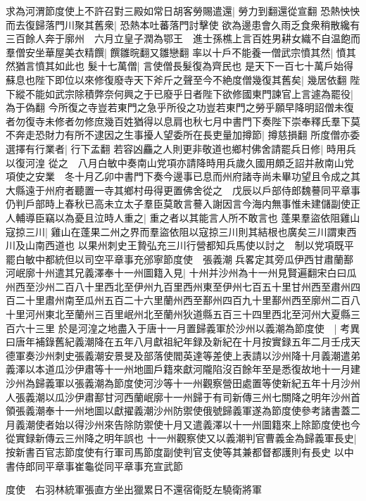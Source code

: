 求為河渭節度使上不許召對三殿如常日胡客勞賜遣還|{
	勞力到翻還從宣翻}
恐熱怏怏而去復歸落門川聚其舊衆|{
	恐熱本吐蕃落門討擊使}
欲為邊患會久雨乏食衆稍散纔有三百餘人奔于廓州　六月立皇子潤為鄂王　進士孫樵上言百姓男耕女織不自温飽而羣僧安坐華屋美衣精饌|{
	饌雛晥翻又雛戀翻}
率以十戶不能養一僧武宗憤其然|{
	憤其然猶言憤其如此也}
髮十七萬僧|{
	言使僧長髮復為齊民也}
是天下一百七十萬戶始得蘇息也陛下即位以來修復廢寺天下斧斤之聲至今不絶度僧幾復其舊矣|{
	幾居依翻}
陛下縱不能如武宗除積弊奈何興之于已廢乎日者陛下欲修國東門諫官上言遽為罷役|{
	為于偽翻}
今所復之寺豈若東門之急乎所役之功豈若東門之勞乎願早降明詔僧未復者勿復寺未修者勿修庶幾百姓猶得以息肩也秋七月中書門下奏陛下崇奉釋氏羣下莫不奔走恐財力有所不逮因之生事擾人望委所在長吏量加撙節|{
	撙慈損翻}
所度僧亦委選擇有行業者|{
	行下孟翻}
若容凶麤之人則更非敬道也鄉村佛舍請罷兵日修|{
	時用兵以復河湟}
從之　八月白敏中奏南山党項亦請降時用兵歲久國用頗乏詔并赦南山党項使之安業　冬十月乙卯中書門下奏今邊事已息而州府諸寺尚未畢功望且令成之其大縣遠于州府者聽置一寺其鄉村毋得更置佛舍從之　戊辰以戶部侍郎魏謩同平章事仍判戶部時上春秋已高未立太子羣臣莫敢言謩入謝因言今海内無事惟未建儲副使正人輔導臣竊以為憂且泣時人重之|{
	重之者以其能言人所不敢言也}
蓬果羣盜依阻雞山寇掠三川|{
	雞山在蓬果二州之界而羣盜依阻以寇掠三川則其結根也廣矣三川謂東西川及山南西道也}
以果州刺史王贄弘充三川行營都知兵馬使以討之　制以党項既平罷白敏中都統但以司空平章事充邠寧節度使　張義潮兵畧定其旁瓜伊西甘肅蘭鄯河岷廓十州遣其兄義澤奉十一州圖籍入見|{
	十州并沙州為十一州見賢遍翻宋白曰瓜州西至沙州二百八十里西北至伊州九百里西州東至伊州七百五十里甘州西至肅州四百二十里肅州南至瓜州五百二十六里蘭州西至鄯州四百九十里鄯州西至廓州二百八十里河州東北至蘭州三百里岷州北至蘭州狄道縣五百三十四里西北至河州大夏縣三百六十三里}
於是河湟之地盡入于唐十一月置歸義軍於沙州以義潮為節度使　|{
	考異曰唐年補錄舊紀義潮降在五年八月獻祖紀年録及新紀在十月按實録五年二月壬戌天德軍奏沙州刺史張義潮安景旻及部落使閻英達等差使上表請以沙州降十月義潮遣弟義澤以本道瓜沙伊肅等十一州地圖戶籍來獻河隴陷沒百餘年至是悉復故地十一月建沙州為歸義軍以張義潮為節度使河沙等十一州觀察營田處置等使新紀五年十月沙州人張義潮以瓜沙伊肅鄯甘河西蘭岷廓十一州歸于有司新傳三州七關降之明年沙州首領張義潮奉十一州地圖以獻擢義潮沙州防禦使俄號歸義軍遂為節度使參考諸書蓋二月義潮使者始以得沙州來告除防禦使十月又遣義澤以十一州圖籍來上除節度使也今從實録新傳云三州降之明年誤也}
十一州觀察使又以義潮判官曹義金為歸義軍長史|{
	按新書百官志節度使有行軍司馬節度副使判官支使等其兼都督都護則有長史}
以中書侍郎同平章事崔龜從同平章事充宣武節

度使　右羽林統軍張直方坐出獵累日不還宿衛貶左驍衛將軍

